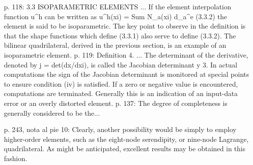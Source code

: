 \documentclass[11pt,a4paper]{article}
\newcommand{\campo}[1]{\textcolor{gris}{\footnotesize #1}}
\begin{document}
\begin{pasaje}\footnotesize p. 118: \textquotedbl{}3.3 ISOPARAMETRIC ELEMENTS ... If the element interpolation function u\textasciicircum{}h can be written as u\textasciicircum{}h(xi) = Sum N\_a(xi) d\_a\textasciicircum{}e (3.3.2) the element is said to be isoparametric. The key point to observe in the definition is that the shape functions which define (3.3.1) also serve to define (3.3.2). The bilinear quadrilateral, derived in the previous section, is an example of an isoparametric element.\textquotedbl{} p. 119: \textquotedbl{}Definition 4. ... The determinant of the derivative, denoted by j = det(dx/dxi), is called the Jacobian determinant\textquotedbl{} y \textquotedbl{}3. In actual computations the sign of the Jacobian determinant is monitored at special points to ensure condition (iv) is satisfied. If a zero or negative value is encountered, computations are terminated. Generally this is an indication of an input-data error or an overly distorted element.\textquotedbl{} p. 137: \textquotedbl{}The degree of completeness is generally considered to be the...\end{pasaje}
\vspace{3pt}\noindent{\small\textbf{p.\ 243 (nota al pie 10)} \quad \campo{En la membrana de Cook el desplazamiento converge a 23,96, el Q4 con malla 8x8 da u\_y = 22,08 (7,9 \% por debajo) por shear-locking, y el Q9 lo evita y converge con rapidez. --- tesis/capitulos/02\_marco\_teorico.tex:408}}\par
\begin{pasaje}\footnotesize p. 243, nota al pie 10: \textquotedbl{}Clearly, another possibility would be simply to employ higher-order elements, such as the eight-node serendipity, or nine-node Lagrange, quadrilateral. As might be anticipated, excellent results may be obtained in this fashion.\textquotedbl{}\end{pasaje}
\vspace{6pt}
\end{document}
